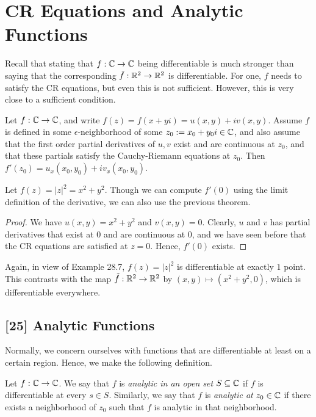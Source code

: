 \documentclass{article}
\begin{document}
\section{CR Equations and Analytic Functions}
Recall that stating that $f: \mathbb C\to\mathbb C$ being differentiable is much stronger than saying that the corresponding $\tilde f: \mathbb R^2\to \mathbb R^2$ is differentiable. For one, $f$ needs to satisfy the CR equations, but even this is not sufficient. However, this is very close to a sufficient condition.
\begin{theorem}
Let $f:\mathbb C\to \mathbb C$, and write $f(z) = f(x+yi) = u(x,y) 
 +iv(x,y)$. Assume $f$ is defined in some $\epsilon$-neighborhood of some $z_0 := x_0 + y_0i\in\mathbb C$, and also assume that the first order partial derivatives of $u, v$ exist and are continuous at $z_0$, and that these partials satisfy the Cauchy-Riemann equations at $z_0$. Then $f'(z_0) = u_x(x_0, y_0) + iv_x(x_0, y_0)$.
\end{theorem}
\begin{example}
Let $f(z) = |z|^2 = x^2+y^2$. Though we can compute $f'(0)$ using the limit definition of the derivative, we can also use the previous theorem.
\end{example}
\begin{proof}
We have $u(x,y) = x^2+y^2$ and $v(x,y) = 0$. Clearly, $u$ and $v$ has partial derivatives that exist at $0$ and are continuous at $0$, and we have seen before that the CR equations are satisfied at $z=0$. Hence, $f'(0)$ exists.
\end{proof}

Again, in view of Example 28.7, $f(z) = |z|^2$ is differentiable at exactly $1$ point. This contrasts with the map $\tilde f: \mathbb R^2\to \mathbb R^2$ by $(x,y) \mapsto (x^2+y^2,0)$, which is differentiable everywhere.

\subsection*{[25] Analytic Functions}
Normally, we concern ourselves with functions that are differentiable at least on a certain region. Hence, we make the following definition.
\begin{definition}
Let $f: \mathbb C\to \mathbb C$. We say that $f$ is \textit{analytic in an open set} $S\subseteq \mathbb C$ if $f$ is differentiable at every $s\in S$. Similarly, we say that $f$ is \textit{analytic at} $z_0\in\mathbb C$ if there exists a neighborhood of $z_0$ such that $f$ is analytic in that neighborhood.
\end{definition}
\end{document}

